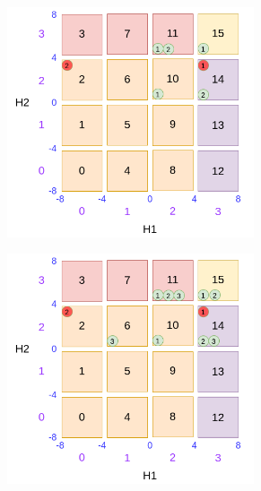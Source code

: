 \begin{figure}
\begin{subfigure}{0.45\textwidth}
		\caption{}
		\label{fig:dsbo-example-e}
	\end{subfigure}
	\begin{subfigure}{0.45\textwidth}
		\includegraphics[width=0.8\textwidth]{figures/draw/f.png}
		\caption{}
		\label{fig:dsbo-example-f}
	\end{subfigure}
	\begin{subfigure}{0.45\textwidth}
		\includegraphics[width=0.8\textwidth]{figures/draw/g.png}
		\caption{}
		\label{fig:dsbo-example-g}
	\end{subfigure}
	\begin{subfigure}{0.45\textwidth}

\end{subfigure}
\end{figure}
